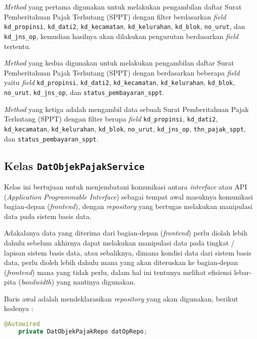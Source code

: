 \documentclass[pdftex,12pt, oneside]{article}
\begin{document}
\textit{Method} yang pertama digunakan untuk melakukan pengambilan daftar Surat Pemberitahuan Pajak Terhutang (SPPT) dengan filter berdasarkan \textit{field} \texttt{kd\_propinsi}, \texttt{kd\_dati2}, \texttt{kd\_kecamatan}, \texttt{kd\_kelurahan}, \texttt{kd\_blok}, \texttt{no\_urut}, dan \texttt{kd\_jns\_op}, kemudian hasilnya akan dilakukan pengurutan berdasarkan \textit{field} tertentu.

\textit{Method} yang kedua digunakan untuk melakukan pengambilan daftar Surat Pemberitahuan Pajak Terhutang (SPPT) dengan berdasarkan beberapa \textit{field} yaitu \textit{field} \texttt{kd\_propinsi}, \texttt{kd\_dati2}, \texttt{kd\_kecamatan}, \texttt{kd\_kelurahan}, \texttt{kd\_blok}, \texttt{no\_urut}, \texttt{kd\_jns\_op}, dan \texttt{status\_pembayaran\_sppt}.

\textit{Method} yang ketiga adalah mengambil data sebuah Surat Pemberitahuan Pajak Terhutang (SPPT) dengan filter berupa \textit{field} \texttt{kd\_propinsi}, \texttt{kd\_dati2}, \texttt{kd\_kecamatan}, \texttt{kd\_kelurahan}, \texttt{kd\_blok}, \texttt{no\_urut}, \texttt{kd\_jns\_op}, \texttt{thn\_pajak\_sppt}, dan \texttt{status\_pembayaran\_sppt}.

\subsection{Kelas \texttt{DatObjekPajakService}}

Kelas ini bertujuan untuk menjembatani komunikasi antara \textit{interface} atau API (\textit{Application Programmable Interface}) sebagai tempat awal masuknya komunikasi bagian-depan (\textit{frontend}), dengan \textit{repository} yang bertugas melakukan manipulasi data pada sistem basis data.

Adakalanya data yang diterima dari bagian-depan (\textit{frontend}) perlu diolah lebih dahulu sebelum akhirnya dapat melakukan manipulasi data pada tingkat / lapisan sistem basis data, atau sebaliknya, dimana kondisi data dari sistem basis data, perlu dioleh lebih dahulu mana yang akan diteruskan ke bagian-depan (\textit{frontend}) mana yang tidak perlu, dalam hal ini tentunya melihat efisiensi lebar-pita (\textit{bandwidth}) yang nantinya digunakan.

Baris awal adalah mendeklarasikan \textit{repository} yang akan digunakan, berikut kodenya :

\begin{lstlisting}[language=java]
    @Autowired
    private DatObjekPajakRepo datOpRepo;
\end{lstlisting}
\end{document}
